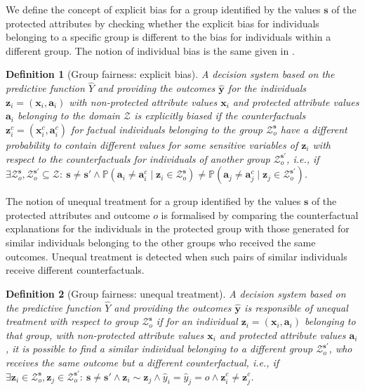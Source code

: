 \documentclass[letterpaper]{article} %
\newtheorem{definition}{Definition}
\begin{document}
We define the concept of explicit bias for a group identified by the values $\boldsymbol{s}$ of the protected attributes by checking whether the explicit bias for individuals belonging to a specific group is different to the bias for individuals within a different group.
%
The notion of individual bias is the same given in .
%
\begin{definition}[Group fairness: explicit bias]\label{explicit_bias_group}
	A decision system based on the predictive function $\hat{Y}$ and providing the outcomes $\boldsymbol{\hat{y}}$ for the individuals $\boldsymbol{z}_i = (\boldsymbol{x}_i, \boldsymbol{a}_i)$ with non-protected attribute values $\boldsymbol{x}_{i}$ and protected attribute values $\boldsymbol{a}_{i}$ belonging to the domain $\mathcal{Z}$ is \emph{explicitly biased} if the counterfactuals $\boldsymbol{z}_i^c = (\boldsymbol{x}_i^c, \boldsymbol{a}_i^c)$ for factual individuals belonging to the group $\mathcal{Z}^{\boldsymbol{s}}_o$ have a different probability to contain different values for some sensitive variables of $\boldsymbol{z}_i$ with respect to the counterfactuals for individuals of another group $\mathcal{Z}^{\boldsymbol{s}'}_o$, i.e., if $\exists \mathcal{Z}^{\boldsymbol{s}}_o, \mathcal{Z}^{\boldsymbol{s}'}_o \subseteq \mathcal{Z} : ~ \boldsymbol{s} \neq \boldsymbol{s}' \wedge \mathbb{P}(\boldsymbol{a}_{i} \neq \boldsymbol{a}_{i}^{c} \mid \boldsymbol{z}_i \in \mathcal{Z}^{\boldsymbol{s}}_o) \neq \mathbb{P}(\boldsymbol{a}_{j} \neq \boldsymbol{a}_{j}^{c} \mid \boldsymbol{z}_j \in \mathcal{Z}^{\boldsymbol{s}'}_o)$.
\end{definition}

The notion of unequal treatment for a group identified by the values $\boldsymbol{s}$ of the protected attributes and outcome $o$ is formalised by comparing the counterfactual explanations for the individuals in the protected group with those generated for similar individuals belonging to the other groups who received the same outcomes.
%
Unequal treatment is detected when such pairs of similar individuals receive different counterfactuals.
%
\begin{definition}[Group fairness: unequal treatment]\label{unequal_treatment_group}
	A decision system based on the predictive function $\hat{Y}$ and providing the outcomes $\boldsymbol{\hat{y}}$ is responsible of \emph{unequal treatment} with respect to group $\mathcal{Z}^{\boldsymbol{s}}_o$ if for an individual $\boldsymbol{z}_i = (\boldsymbol{x}_i, \boldsymbol{a}_i)$ belonging to that group, with non-protected attribute values $\boldsymbol{x}_i$ and protected attribute values $\boldsymbol{a}_i$, it is possible to find a similar individual belonging to a different group $\mathcal{Z}^{\boldsymbol{s}'}_o$, who receives the same outcome but a different counterfactual, i.e., if $\exists \boldsymbol{z}_i \in \mathcal{Z}^{\boldsymbol{s}}_o, \boldsymbol{z}_j \in \mathcal{Z}^{\boldsymbol{s}'}_o : ~ \boldsymbol{s} \neq \boldsymbol{s}' \wedge \boldsymbol{z}_i \sim \boldsymbol{z}_j \wedge \hat{y}_i = \hat{y}_j = o \wedge \boldsymbol{z}_i^c \neq \boldsymbol{z}_j^c$.
\end{definition}
\end{document}
